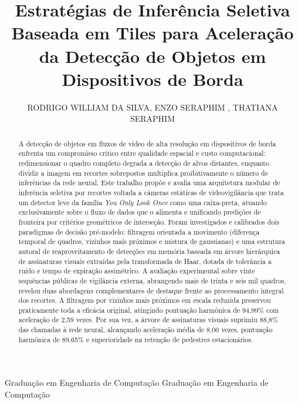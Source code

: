 \documentclass{ieeeaccess}
\begin{document}
\title{Estratégias de Inferência Seletiva Baseada em Tiles para Aceleração da Detecção de Objetos em Dispositivos de Borda}
\author{\uppercase{Rodrigo William da Silva},
        \uppercase{Enzo Seraphim} ,
        \uppercase{Thatiana Seraphim} }

\markboth
{Graduação em Engenharia de Computação}
{Graduação em Engenharia de Computação}


\begin{abstract}
    A detecção de objetos em fluxos de vídeo de alta resolução em dispositivos de borda enfrenta um compromisso crítico entre qualidade espacial e custo computacional: redimensionar o quadro completo degrada a detecção de alvos distantes, enquanto dividir a imagem em recortes sobrepostos multiplica proibitivamente o número de inferências da rede neural. Este trabalho propõe e avalia uma arquitetura modular de inferência seletiva por recortes voltada a câmeras estáticas de videovigilância que trata um detector leve da família \textit{You Only Look Once} como uma caixa-preta, atuando exclusivamente sobre o fluxo de dados que o alimenta e unificando predições de fronteira por critérios geométricos de interseção. Foram investigados e calibrados dois paradigmas de decisão pré-modelo: filtragem orientada a movimento (diferença temporal de quadros, vizinhos mais próximos e mistura de gaussianas) e uma estrutura autoral de reaproveitamento de detecções em memória baseada em árvore hierárquica de assinaturas visuais extraídas pela transformada de Haar, dotada de tolerância a ruído e tempo de expiração assimétrico. A avaliação experimental sobre vinte sequências públicas de vigilância externa, abrangendo mais de trinta e seis mil quadros, revelou duas abordagens complementares de destaque frente ao processamento integral dos recortes. A filtragem por vizinhos mais próximos em escala reduzida preservou praticamente toda a eficácia original, atingindo pontuação harmônica de 94,99\% com aceleração de 2,59 vezes. Por sua vez, a árvore de assinaturas visuais suprimiu 88,8\% das chamadas à rede neural, alcançando aceleração média de 8,00 vezes, pontuação harmônica de 89,65\% e superioridade na retenção de pedestres estacionários.
\end{abstract}
\end{document}
